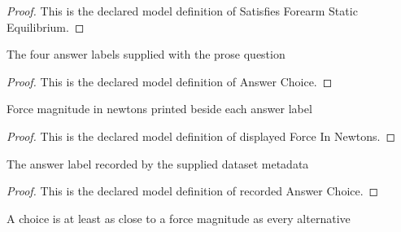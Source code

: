 \begin{proof}
  This is the declared model definition of Satisfies Forearm Static Equilibrium.
\end{proof}
\begin{definition}
  \label{def:physics:phyx-mini-0707:phyxminiproblems-problemphyxmini0707-answerchoice}
  The four answer labels supplied with the prose question
\end{definition}
\begin{proof}
  This is the declared model definition of Answer Choice.
\end{proof}
\begin{definition}
  \label{def:physics:phyx-mini-0707:phyxminiproblems-problemphyxmini0707-displayedforceinnewtons}
  Force magnitude in newtons printed beside each answer label
\end{definition}
\begin{proof}
  This is the declared model definition of displayed Force In Newtons.
\end{proof}
\begin{definition}
  \label{def:physics:phyx-mini-0707:phyxminiproblems-problemphyxmini0707-recordedanswerchoice}
  The answer label recorded by the supplied dataset metadata
\end{definition}
\begin{proof}
  This is the declared model definition of recorded Answer Choice.
\end{proof}
\begin{definition}
  \label{def:physics:phyx-mini-0707:phyxminiproblems-problemphyxmini0707-isnearestdisplayedforce}
  A choice is at least as close to a force magnitude as every alternative
\end{definition}
